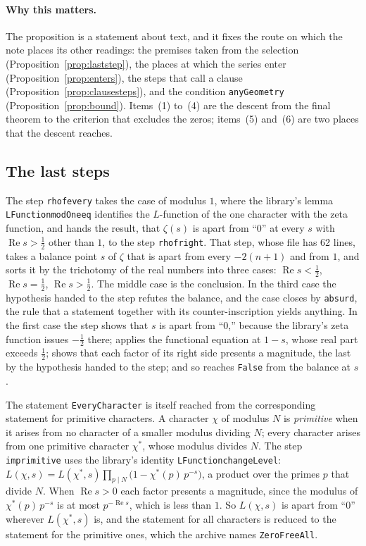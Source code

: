 \documentclass[11pt]{article}
\theoremstyle{definition}
\theoremstyle{remark}
\newcommand{\re}{\operatorname{Re}}
\DeclareRobustCommand{\lean}[1]{{\renewcommand{\_}{\textunderscore\allowbreak}\texttt{#1}}}
\newcommand{\False}{\lean{False}}
\begin{document}
\paragraph{Why this matters.} The proposition is a statement about text, and it fixes the route on which the note places its other readings: the premises taken from the selection (Proposition~\ref{prop:laststep}), the places at which the series enter (Proposition~\ref{prop:enters}), the steps that call a clause (Proposition~\ref{prop:clausesteps}), and the condition \lean{anyGeometry} (Proposition~\ref{prop:bound}). Items~(1) to~(4) are the descent from the final theorem to the criterion that excludes the zeros; items~(5) and~(6) are two places that the descent reaches.

\subsection{The last steps}

The step \lean{rh\_of\_every} takes the case of modulus $1$, where the library's lemma \lean{LFunction\_modOne\_eq} identifies the $L$-function of the one character with the zeta function, and hands the result, that $\zeta(s)$ is apart from ``0'' at every $s$ with $\re s>\tfrac12$ other than $1$, to the step \lean{rh\_of\_right}. That step, whose file has 62 lines, takes a balance point $s$ of $\zeta$ that is apart from every $-2(n+1)$ and from $1$, and sorts it by the trichotomy of the real numbers into three cases: $\re s<\tfrac12$, $\re s=\tfrac12$, $\re s>\tfrac12$. The middle case is the conclusion. In the third case the hypothesis handed to the step refutes the balance, and the case closes by \lean{absurd}, the rule that a statement together with its counter-inscription yields anything. In the first case the step shows that $s$ is apart from ``0,'' because the library's zeta function issues $-\tfrac12$ there; applies the functional equation at $1-s$, whose real part exceeds $\tfrac12$; shows that each factor of its right side presents a magnitude, the last by the hypothesis handed to the step; and so reaches \False{} from the balance at $s$.

The statement \lean{EveryCharacter} is itself reached from the corresponding statement for primitive characters. A character $\chi$ of modulus $N$ is \emph{primitive} when it arises from no character of a smaller modulus dividing $N$; every character arises from one primitive character $\chi^{*}$, whose modulus divides $N$. The step \lean{imprimitive} uses the library's identity \lean{LFunction\_changeLevel}: $L(\chi,s)=L(\chi^{*},s)\prod_{p\mid N}\bigl(1-\chi^{*}(p)\,p^{-s}\bigr)$, a product over the primes $p$ that divide $N$. When $\re s>0$ each factor presents a magnitude, since the modulus of $\chi^{*}(p)\,p^{-s}$ is at most $p^{-\re s}$, which is less than $1$. So $L(\chi,s)$ is apart from ``0'' wherever $L(\chi^{*},s)$ is, and the statement for all characters is reduced to the statement for the primitive ones, which the archive names \lean{ZeroFreeAll}.
\end{document}
